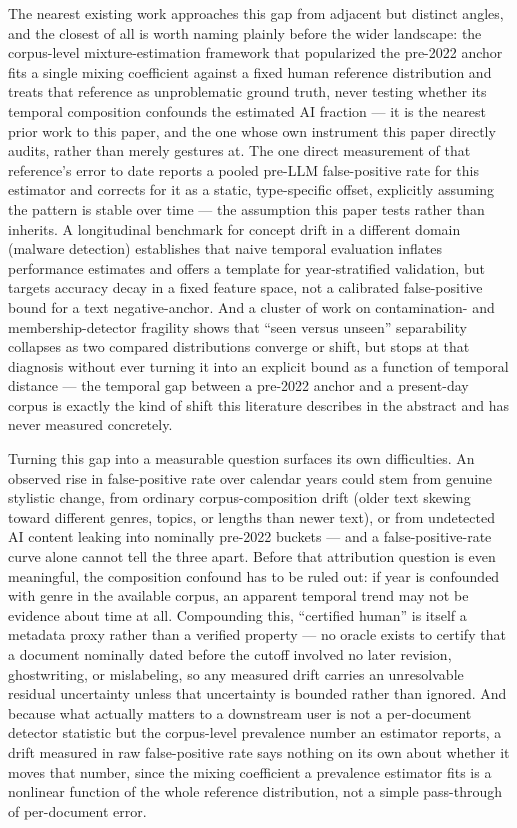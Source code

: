 \documentclass[11pt]{article}
\begin{document}
The nearest existing work approaches this gap from adjacent but distinct angles, and the closest of all is worth naming plainly before the wider landscape: the corpus-level mixture-estimation framework that popularized the pre-2022 anchor \citep{MonitorAIScale} fits a single mixing coefficient against a fixed human reference distribution and treats that reference as unproblematic ground truth, never testing whether its temporal composition confounds the estimated AI fraction --- it is the nearest prior work to this paper, and the one whose own instrument this paper directly audits, rather than merely gestures at. The one direct measurement of that reference's error to date \citep{LLMGeneratedOrHumanWritten} reports a pooled pre-LLM false-positive rate for this estimator and corrects for it as a static, type-specific offset, explicitly assuming the pattern is stable over time --- the assumption this paper tests rather than inherits. A longitudinal benchmark for concept drift in a different domain (malware detection) \citep{LAMDA} establishes that naive temporal evaluation inflates performance estimates and offers a template for year-stratified validation, but targets accuracy decay in a fixed feature space, not a calibrated false-positive bound for a text negative-anchor. And a cluster of work on contamination- and membership-detector fragility \citep{BenchContamFragility,MinKpp,ContamICL,MarkovCalib} shows that ``seen versus unseen'' separability collapses as two compared distributions converge or shift, but stops at that diagnosis without ever turning it into an explicit bound as a function of temporal distance --- the temporal gap between a pre-2022 anchor and a present-day corpus is exactly the kind of shift this literature describes in the abstract and has never measured concretely.

Turning this gap into a measurable question surfaces its own difficulties. An observed rise in false-positive rate over calendar years could stem from genuine stylistic change, from ordinary corpus-composition drift (older text skewing toward different genres, topics, or lengths than newer text), or from undetected AI content leaking into nominally pre-2022 buckets --- and a false-positive-rate curve alone cannot tell the three apart. Before that attribution question is even meaningful, the composition confound has to be ruled out: if year is confounded with genre in the available corpus, an apparent temporal trend may not be evidence about time at all. Compounding this, ``certified human'' is itself a metadata proxy rather than a verified property --- no oracle exists to certify that a document nominally dated before the cutoff involved no later revision, ghostwriting, or mislabeling, so any measured drift carries an unresolvable residual uncertainty unless that uncertainty is bounded rather than ignored. And because what actually matters to a downstream user is not a per-document detector statistic but the corpus-level prevalence number an estimator reports, a drift measured in raw false-positive rate says nothing on its own about whether it moves that number, since the mixing coefficient a prevalence estimator fits is a nonlinear function of the whole reference distribution, not a simple pass-through of per-document error.
\end{document}
